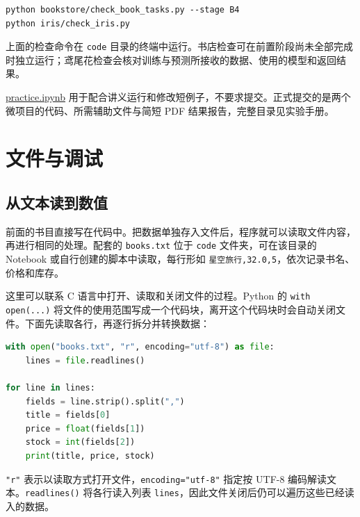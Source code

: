 \documentclass[UTF8,a4paper,11pt,fontset=fandol]{ctexart}
\providecommand{\passthrough}[1]{#1}
\begin{document}
\begin{lstlisting}[language={}]
python bookstore/check_book_tasks.py --stage B4
python iris/check_iris.py
\end{lstlisting}

上面的检查命令在 \passthrough{\lstinline!code!} 目录的终端中运行。书店检查可在前置阶段尚未全部完成时独立运行；鸢尾花检查会核对训练与预测所接收的数据、使用的模型和返回结果。

\href{code/practice.ipynb}{practice.ipynb} 用于配合讲义运行和修改短例子，不要求提交。正式提交的是两个微项目的代码、所需辅助文件与简短 PDF 结果报告，完整目录见实验手册。

\clearpage

\section{文件与调试}\label{ux6587ux4ef6ux4e0eux8c03ux8bd5}

\subsection{从文本读到数值}\label{ux4eceux6587ux672cux8bfbux5230ux6570ux503c}

前面的书目直接写在代码中。把数据单独存入文件后，程序就可以读取文件内容，再进行相同的处理。配套的 \passthrough{\lstinline!books.txt!} 位于 \passthrough{\lstinline!code!} 文件夹，可在该目录的 Notebook 或自行创建的脚本中读取，每行形如 \passthrough{\lstinline!星空旅行,32.0,5!}，依次记录书名、价格和库存。

这里可以联系 C 语言中打开、读取和关闭文件的过程。Python 的 \passthrough{\lstinline!with open(...)!} 将文件的使用范围写成一个代码块，离开这个代码块时会自动关闭文件。下面先读取各行，再逐行拆分并转换数据：

\begin{lstlisting}[language=Python]
with open("books.txt", "r", encoding="utf-8") as file:
    lines = file.readlines()

for line in lines:
    fields = line.strip().split(",")
    title = fields[0]
    price = float(fields[1])
    stock = int(fields[2])
    print(title, price, stock)
\end{lstlisting}

\passthrough{\lstinline!"r"!} 表示以读取方式打开文件，\passthrough{\lstinline!encoding="utf-8"!} 指定按 UTF-8 编码解读文本。\passthrough{\lstinline!readlines()!} 将各行读入列表 \passthrough{\lstinline!lines!}，因此文件关闭后仍可以遍历这些已经读入的数据。
\end{document}
